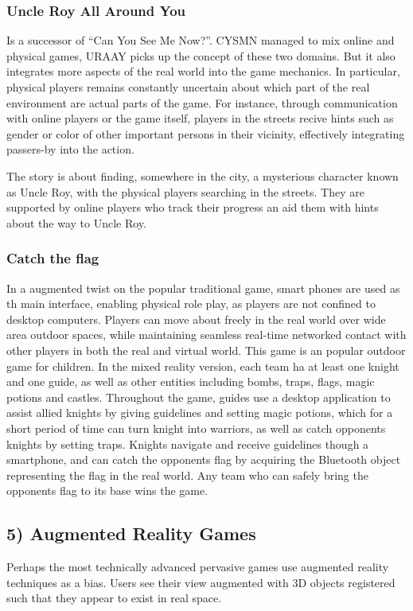       \subsubsection*{Uncle Roy All Around You}
      Is a successor of ``Can You See Me Now?''. CYSMN managed to mix online and physical games, URAAY picks up the concept of these two domains. But it also integrates more aspects of the real world into the game mechanics. In particular, physical players remains constantly uncertain about which part of the real environment are actual parts of the game. For instance, through communication with online players or the game itself, players in the streets recive hints such as gender or color of other important persons in their vicinity, effectively integrating passers-by into the action. 

      The story is about finding, somewhere in the city, a mysterious character known as Uncle Roy, with the physical players searching in the streets. They are supported by online players who track their progress an aid them with hints about the way to Uncle Roy. 

      \subsubsection*{Catch the flag}
      In a augmented twist on the popular traditional game, smart phones are used as th main interface, enabling physical role play, as players are not confined to desktop computers. Players can move about freely in the real world over wide area outdoor spaces, while maintaining seamless real-time networked contact with other players in both the real and virtual world. 
      This game is an popular outdoor game for children. In the mixed reality version, each team ha at least one knight and one guide, as well as other entities including bombs, traps, flags, magic potions and castles. Throughout the game, guides use a desktop application to assist allied knights by giving guidelines and setting magic potions, which for a short period of time can turn knight into warriors, as well as catch opponents knights by setting traps. Knights navigate and receive guidelines though a smartphone, and can catch the opponents flag by acquiring the Bluetooth object representing the flag in the real world. Any team who can safely bring the opponents flag to its base wins the game. 

    \subsection*{5) Augmented Reality Games}
    Perhaps the most technically advanced pervasive games use augmented reality techniques as a bias. Users see their view augmented with 3D objects registered such that they appear to exist in real space. 

